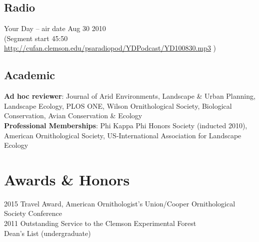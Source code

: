 \documentclass[11pt,a4paper,]{moderncv}
\begin{document}
\subsection{Radio}\label{radio}

Your Day -- air date Aug 30 2010\\
(Segment start 45:50
\url{http://cufan.clemson.edu/psaradiopod/YDPodcast/YD100830.mp3} )

\subsection{Academic}\label{academic}

\textbf{Ad hoc reviewer}: Journal of Arid Environments, Landscape \&
Urban Planning, Landscape Ecology, PLOS ONE, Wilson Ornithological
Society, Biological Conservation, Avian Conservation \& Ecology\\
\textbf{Professional Memberships}: Phi Kappa Phi Honors Society
(inducted 2010), American Ornithological Society, US-International
Association for Landscape Ecology

\section{Awards \& Honors}\label{awards-honors}

2015 Travel Award, American Ornithologist's Union/Cooper Ornithological
Society Conference\\
2011 Outstanding Service to the Clemson Experimental Forest\\
Dean's List (undergraduate)
\end{document}
